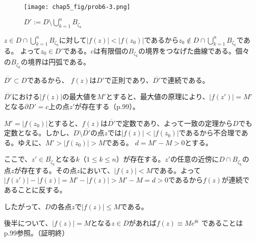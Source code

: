 \begin{figure}[h]
    \centering
    \texttt{[image: chap5\_fig/prob6-3.png]}
    \caption{$D':=D\setminus\bigcup_{k=1}^{n}B_{\zeta_k}$}
    \label{fig:chap5-6-3}
\end{figure}

$z\in D\cap \bigcup_{k=1}^{n}B_{\zeta_k}$に対して$|f(z)|<|f(z_0)|$であるから$z_0\not\in D\cap \bigcup_{k=1}^{n}B_{\zeta_k}$である。
よって$z_0\in D'$である。$c$は有限個の$B_{\zeta_k}$の境界をつなげた曲線である。個々の$B_{\zeta_k}$の境界は円弧である。

$\overline{D'}\subset D$であるから、
$f(z)$は$D'$で正則であり、$\overline{D'}$で連続である。

$\overline{D'}$における$|f(z)|$の最大値を$M'$とすると、最大値の原理により、$|f(z')|=M'$となる$\partial D'=c$上の点$z'$が存在する（p.99）。

$M'=|f(z_0)|$とすると、$f(z)$は$\overline{D'}$で定数であり、よって一致の定理から$D$でも定数となる。しかし、$D\setminus\overline{D'}$の点$z$では$|f(z)|<|f(z_0)|$であるから不合理である。ゆえに、$M'>|f(z_0)|>M$である。
$d=M'-M>0$とする。

ここで、$z'\in\overline{B_{\zeta_k}}$となる$k$（$1\le k\le n$）が存在する。$z'$の任意の近傍に$D\cap B_{\zeta_k}$の点$z$が存在する。その点$z$において、$|f(z)|<M$である。よって$|f(z')|-|f(z)|=M'-|f(z)|>M'-M=d>0$であるから$f(z)$が連続であることに反する。

したがって、$D$の各点$z$で$|f(z)|\le M$である。



後半について、$|f(z)|=M$となる$z\in D$があれば$f(z)\equiv Me^{\theta i}$
であることはp.99参照。（証明終）

%
%
%
%
%
